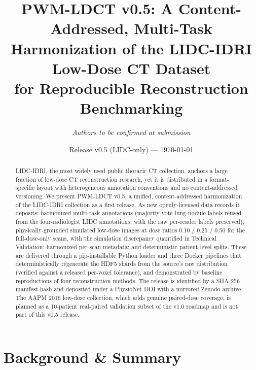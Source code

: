 \documentclass[twoside,11pt]{article}
\title{\textbf{PWM-LDCT v0.5: A Content-Addressed, Multi-Task Harmonization of the LIDC-IDRI Low-Dose CT Dataset \\ for Reproducible Reconstruction Benchmarking}}
\author[1,2]{\textit{Authors to be confirmed at submission}}
\affil[1]{University of Texas Southwestern Medical Center, Dallas, TX, USA}
\affil[2]{PWM Protocol Foundation}
\date{Release v0.5 (LIDC-only) --- \today}
\begin{document}
\maketitle

\begin{abstract}
\noindent LIDC-IDRI, the most widely used public thoracic CT collection, anchors a large fraction of low-dose CT reconstruction research, yet it is distributed in a format-specific layout with heterogeneous annotation conventions and no content-addressed versioning. We present PWM-LDCT v0.5, a unified, content-addressed harmonization of the LIDC-IDRI collection as a first release. As new openly-licensed data records it deposits: harmonized multi-task annotations (majority-vote lung-nodule labels reused from the four-radiologist LIDC annotations, with the raw per-reader labels preserved); physically-grounded simulated low-dose images at dose ratios 0.10 / 0.25 / 0.50 for the full-dose-only scans, with the simulation discrepancy quantified in Technical Validation; harmonized per-scan metadata; and deterministic patient-level splits. These are delivered through a pip-installable Python loader and three Docker pipelines that deterministically regenerate the HDF5 shards from the source's raw distribution (verified against a released per-voxel tolerance), and demonstrated by baseline reproductions of four reconstruction methods. The release is identified by a SHA-256 manifest hash and deposited under a PhysioNet DOI with a mirrored Zenodo archive. The AAPM 2016 low-dose collection, which adds genuine paired-dose coverage, is planned as a 10-patient real-paired validation subset of the v1.0 roadmap and is not part of this v0.5 release.
\end{abstract}

\section*{Background \& Summary}
\end{document}
